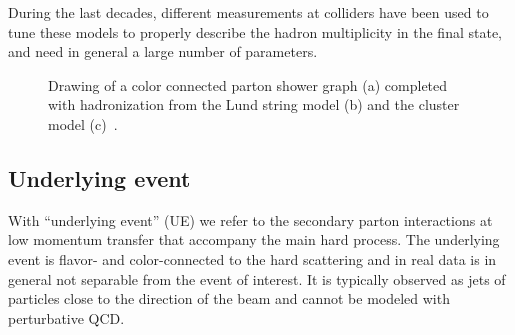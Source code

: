 During the last decades, different measurements at colliders have
been used to tune these models to properly describe 
the hadron multiplicity in the final state,
and need in general a large number of parameters.



\begin{figure}[hbt]\begin{center}
	\caption{Drawing of a color connected parton shower graph (a) completed with hadronization from the Lund string model (b) and the cluster model (c)~\cite{Mangano:933464}.}
\end{center}\end{figure}



\subsection{Underlying event}\label{sec:underlyingevent}

With ``underlying event'' (UE) we refer to the secondary parton interactions 
at low momentum transfer that accompany the main hard process. 
The underlying event is flavor- and color-connected to the hard scattering
and in real data is in general not separable from the event of interest.
It is typically observed as jets of particles close to the direction
of the beam and cannot be modeled with perturbative QCD.

